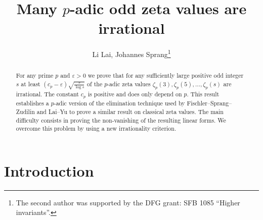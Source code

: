 \documentclass[12pt]{article}
\makeatletter
\newcommand{\subjclass}[2][1991]{%
  \let\@oldtitle\@title%
  \gdef\@title{\@oldtitle\footnotetext{#1 \emph{Mathematics subject classification.} #2}}%
}
\newcommand{\keywords}[1]{%
  \let\@@oldtitle\@title%
  \gdef\@title{\@@oldtitle\footnotetext{\emph{Key words and phrases.} #1.}}%
}
\numberwithin{equation}{section}
\makeatother
\begin{document}
\title {Many $p$-adic odd zeta values are irrational}

\author{Li Lai, Johannes Sprang\thanks{The second author was supported by the DFG grant: SFB 1085 “Higher invariants”.}}
\date{}
\subjclass[2020]{11J72 (primary), 11M06, 33C20 (secondary)}

\maketitle

\begin{abstract}
For any prime $p$ and $\varepsilon>0$ we prove that for any sufficiently large positive odd integer $s$ at least $(c_p-\varepsilon) \sqrt{\frac{s}{\log s}}$ of the $p$-adic zeta values $\zeta_p(3),\zeta_p(5),\dots,\zeta_p(s)$ are irrational. The constant $c_p$ is positive and does only depend on $p$. This result establishes a $p$-adic version of the elimination technique used by Fischler--Sprang--Zudilin and Lai--Yu to prove a similar result  on classical zeta values. The main difficulty consists in proving the non-vanishing of the resulting linear forms. We overcome this problem by using a new irrationality criterion. 
\end{abstract}


\section{Introduction}
\end{document}
